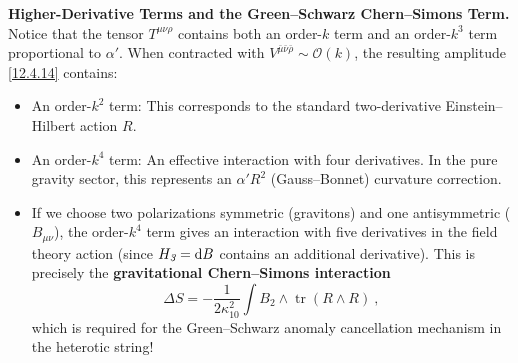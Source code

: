 \begin{tcolorbox}[breakable]
	\begin{remark}
		\textbf{Higher-Derivative Terms and the Green--Schwarz Chern--Simons Term.}
		Notice that the tensor $T^{\mu\nu\rho}$ contains both an order-$k$ term and an order-$k^{3}$ term proportional to $\alpha'$. When contracted with $V^{\bar{\mu}\bar{\nu}\bar{\rho}} \sim \mathcal{O}(k)$, the resulting amplitude \eqref{12.4.14} contains:
		\begin{itemize}
			\item An order-$k^{2}$ term: This corresponds to the standard two-derivative Einstein--Hilbert action $R$.
			\item An order-$k^{4}$ term: An effective interaction with four derivatives. In the pure gravity sector, this represents an $\alpha' R^{2}$ (Gauss--Bonnet) curvature correction.
			\item If we choose two polarizations symmetric (gravitons) and one antisymmetric ($B_{\mu\nu}$), the order-$k^{4}$ term gives an interaction with five derivatives in the field theory action (since $H_{\textit{3}} = \mathrm{d} B$ contains an additional derivative). This is precisely the \textbf{gravitational Chern--Simons interaction}
			\[
			\Delta S = -\frac{1}{2\kappa_{10}^{2}}\int B_{\textit{2}}\wedge \operatorname{tr}(R\wedge R) \:,
			\]
			which is required for the Green--Schwarz anomaly cancellation mechanism in the heterotic string!
		\end{itemize}
	\end{remark}
\end{tcolorbox}

